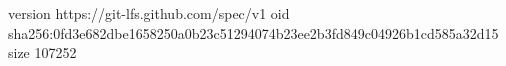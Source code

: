 version https://git-lfs.github.com/spec/v1
oid sha256:0fd3e682dbe1658250a0b23c51294074b23ee2b3fd849c04926b1cd585a32d15
size 107252
